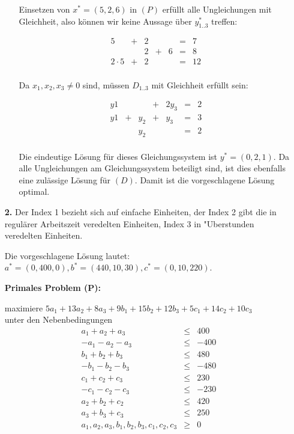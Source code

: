 \documentclass[a4paper,11pt]{article}
\begin{document}
\begin{enumerate}
\begin{enumerate}
        Einsetzen von $x^* = (5, 2, 6)$ in $(P)$ erfüllt alle Ungleichungen mit
        Gleichheit, also können wir keine Aussage über $y^*_{1..3}$ treffen:

        \[\begin{array}{rcrcrcrcr}
                5 &+& 2 & &   &=&  7\\
                  & & 2 &+& 6 &=&  8\\
        2 \cdot 5 &+& 2 & &   &=& 12\\
        \end{array}\]

        Da $x_1, x_2, x_3 \ne 0$ sind, müssen $D_{1..3}$ mit Gleichheit erfüllt
        sein:

        \[\begin{array}{rcrcrcrcr}
            y1 & &      &+& 2y_3 &=& 2\\
            y1 &+&  y_2 &+&  y_3 &=& 3\\
               & &  y_2 & &      &=& 2\\
        \end{array}\]

        Die eindeutige Lösung für dieses Gleichungssystem ist $y^* = (0, 2, 1)$.
        Da alle Ungleichungen am Gleichungssystem beteiligt sind, ist dies ebenfalls
        eine zulässige Lösung für $(D)$. Damit ist die vorgeschlagene Lösung optimal.

    \end{enumerate}

\newpage
\item[\textbf{2.}]
        Der Index 1 bezieht sich auf einfache Einheiten, der Index 2 gibt die
        in regulärer Arbeitszeit veredelten Einheiten, Index 3 in
        "Uberstunden veredelten Einheiten.

        Die vorgeschlagene Lösung lautet: \( a^*=(0, 400, 0), b^*=(440, 10, 30), c^*=(0, 10, 220) \).

        \textbf{Primales Problem (P):}

        maximiere \( 5a_1 + 13a_2 + 8a_3 + 9b_1 + 15b_2 + 12b_3 + 5c_1 + 14c_2 + 10c_3 \)\\
        unter den Nebenbedingungen \\
        \[\begin{array}{rcr}
            a_1 + a_2 + a_3 &\leq& 400 \\
            - a_1 - a_2 - a_3 &\leq& -400 \\
            b_1 + b_2 + b_3 &\leq& 480 \\
            - b_1 - b_2 - b_3 &\leq& -480 \\
            c_1 + c_2 + c_3 &\leq& 230 \\
            - c_1 - c_2 - c_3 &\leq& -230 \\
            a_2 + b_2 + c_2 &\leq& 420 \\
            a_3 + b_3 + c_3 &\leq& 250 \\
            a_1, a_2, a_3, b_1, b_2, b_3, c_1, c_2, c_3 &\geq& 0
        \end{array}\]


\end{enumerate}
\end{document}

